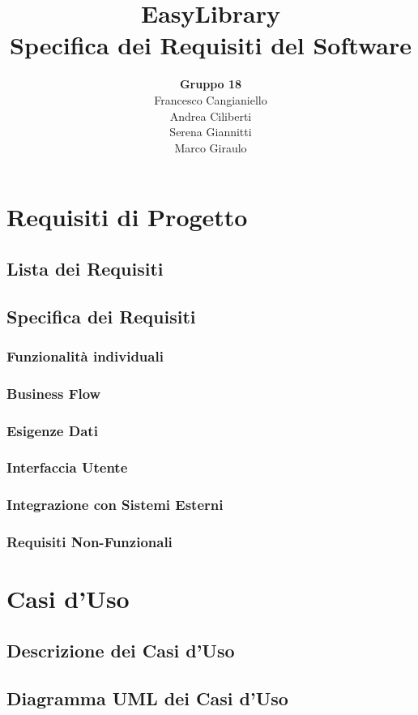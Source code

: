 \documentclass[a4paper, 12pt]{article}
\title{
    \Large EasyLibrary\\
    \vspace{1mm}
    \Huge Specifica dei Requisiti del Software
}
\author{
    \textbf{Gruppo 18}\\
    Francesco Cangianiello\\
    Andrea Ciliberti\\
    Serena Giannitti\\
    Marco Giraulo
}
\begin{document}
\maketitle

\newpage
\tableofcontents

\newpage
\section{Requisiti di Progetto}
\subsection{Lista dei Requisiti}

{
	
}

\newpage
\subsection{Specifica dei Requisiti}
\subsubsection{Funzionalità individuali}
\subsubsection{Business Flow}
\subsubsection{Esigenze Dati}
\subsubsection{Interfaccia Utente}
\subsubsection{Integrazione con Sistemi Esterni}
\subsubsection{Requisiti Non-Funzionali}

\newpage
\section{Casi d'Uso}
\subsection{Descrizione dei Casi d'Uso}
\subsection{Diagramma UML dei Casi d'Uso}
\end{document}
